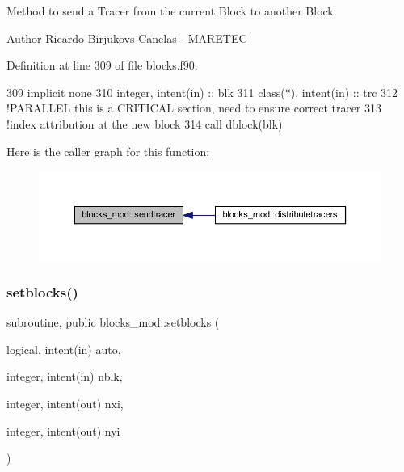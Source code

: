 Method to send a Tracer from the current Block to another Block. 

\begin{DoxyAuthor}{Author}
Ricardo Birjukovs Canelas -\/ M\+A\+R\+E\+T\+EC 
\end{DoxyAuthor}


Definition at line 309 of file blocks.\+f90.


\begin{DoxyCode}
309     \textcolor{keywordtype}{implicit none}
310     \textcolor{keywordtype}{integer}, \textcolor{keywordtype}{intent(in)} :: blk
311     \textcolor{keywordtype}{class}(*), \textcolor{keywordtype}{intent(in)} :: trc
312     \textcolor{comment}{!PARALLEL this is a CRITICAL section, need to ensure correct tracer}
313     \textcolor{comment}{!index attribution at the new block}
314     \textcolor{keyword}{call }dblock(blk)%
\end{DoxyCode}
Here is the caller graph for this function\+:
\nopagebreak
\begin{figure}[H]
\begin{center}
\leavevmode
\includegraphics[width=350pt]{namespaceblocks__mod_a5a9992de40470e417ec8e40e688f6a0e_icgraph}
\end{center}
\end{figure}
\mbox{\label{namespaceblocks__mod_a8f5a5d9e6cfd16cfd1b179092a204696}} 
\subsubsection{\texorpdfstring{setblocks()}{setblocks()}}
{\footnotesize\ttfamily subroutine, public blocks\+\_\+mod\+::setblocks (\begin{DoxyParamCaption}\item[{logical, intent(in)}]{auto,  }\item[{integer, intent(in)}]{nblk,  }\item[{integer, intent(out)}]{nxi,  }\item[{integer, intent(out)}]{nyi }\end{DoxyParamCaption})}



